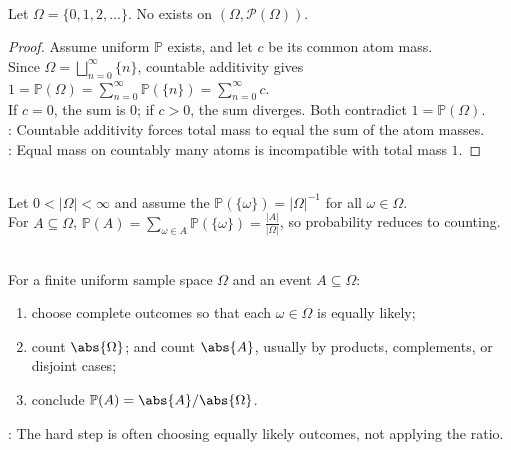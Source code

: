 \begin{proposition} \label{prop:no-uniform-probability-on-countably-infinite-set} \\
Let $\Omega=\{0,1,2,\ldots\}$. No  exists on $(\Omega,\mathcal{P}(\Omega))$.
\begin{proof}
Assume uniform $\mathbb{P}$ exists, and let $c$ be its common atom mass.\\
Since $\Omega=\bigsqcup\limits_{n=0}^{\infty}\{n\}$, countable additivity gives $1=\mathbb{P}(\Omega)=\sum\limits_{n=0}^{\infty}\mathbb{P}(\{n\})=\sum\limits_{n=0}^{\infty}c$.\\
If $c=0$, the sum is $0$; if $c>0$, the sum diverges. Both contradict $1=\mathbb{P}(\Omega)$.\\
: Countable additivity forces total mass to equal the sum of the atom masses.\\
: Equal mass on countably many atoms is incompatible with total mass $1$.
\end{proof}
\end{proposition}

\begin{method} \label{meth:finite-uniform-probability-by-counting} \\
Let $0<|\Omega|<\infty$ and assume the  $\mathbb{P}(\{\omega\})=|\Omega|^{-1}$ for all $\omega\in\Omega$.\\
For $A\subseteq\Omega$, $\mathbb{P}(A)=\sum\limits_{\omega\in A}\mathbb{P}(\{\omega\})=\frac{|A|}{|\Omega|}$, so probability reduces to counting.
\end{method}

\begin{method} \label{meth:finite-uniform-probability-counting-workflow} \\
For a finite uniform sample space $\Omega$ and an event $A\subseteq\Omega$:
\begin{enumerate}[label=(\roman*)]
\setlength{\itemsep}{0pt}
\item choose complete outcomes so that each $\omega\in\Omega$ is equally likely;
\item count $\abs{\Omega}$; and count $\abs{A}$, usually by products, complements, or disjoint cases;
\item conclude $\mathbb{P}(A)=\abs{A}/\abs{\Omega}$.
\end{enumerate}
: The hard step is often choosing equally likely outcomes, not applying the ratio.
\end{method}

